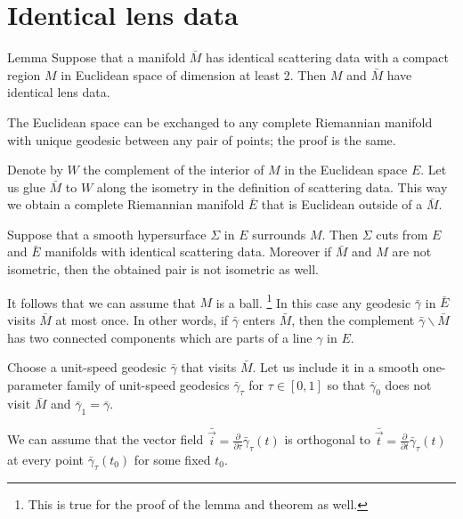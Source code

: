 \section{Identical lens data}

\begin{thm}{Lemma}\label{lem:no-delay}
Suppose that a manifold $\bar M$ has identical scattering data with a compact region $M$ in Euclidean space of dimension at least 2.
Then $M$ and $\bar M$ have identical lens data. 
\end{thm}

The Euclidean space can be exchanged to any complete Riemannian manifold with unique geodesic between any pair of points; the proof is the same.

Denote by $W$ the complement of the interior of $M$ in the Euclidean space $E$.
Let us glue $\bar M$ to $W$ along the isometry in the definition of scattering data.
This way we obtain a complete Riemannian manifold $\bar E$ that is Euclidean outside of a $\bar M$.

Suppose that a smooth hypersurface $\Sigma$ in $E$ surrounds $M$.
Then $\Sigma$ cuts from $E$ and $\bar E$ manifolds with identical scattering data.
Moreover if $\bar M$ and $M$ are not isometric,
then the obtained pair is not isometric as well.

It follows that we can assume that $M$ is a ball.%
\footnote{This is true for the proof of the lemma and theorem as well.}
In this case any geodesic $\bar\gamma$ in $\bar E$ visits $\bar M$ at most once.
In other words, if $\bar\gamma$ enters $\bar M$, then the complement $\bar\gamma\backslash \bar M$ has two connected components which are parts of a line $\gamma$ in $E$.


Choose a unit-speed geodesic $\bar\gamma$ that visits $\bar M$.
Let us include it in a smooth one-parameter family of unit-speed geodesics $\bar\gamma_\tau$ for $\tau\in [0,1]$ so that $\bar\gamma_0$ does not visit $\bar M$ and $\bar \gamma_1=\bar \gamma$.

We can assume that 
the vector field $\bar{\vec i}
=\tfrac{\partial}{\partial\tau}\bar\gamma_\tau(t)$ is orthogonal to $\bar{\vec t}
=\tfrac{\partial}{\partial t}\bar\gamma_\tau(t)$ at every point $\bar\gamma_\tau(t_0)$ for some fixed $t_0$.

